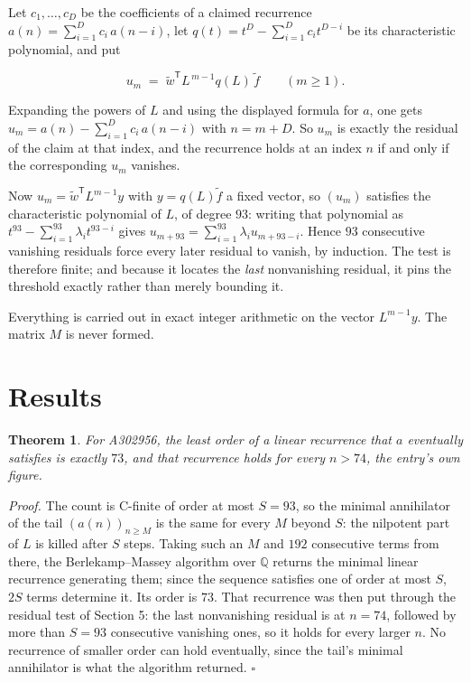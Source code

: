 \documentclass[11pt]{article}
\newtheorem{theorem}{Theorem}
\theoremstyle{definition}
\begin{document}
Let $c_1,\dots,c_D$ be the coefficients of a claimed recurrence $a(n) = \sum_{i=1}^{D} c_i\,a(n-i)$, let $q(t) = t^{D} - \sum_{i=1}^{D} c_i t^{D-i}$ be its characteristic polynomial, and put

\[u_m \;=\; \tilde w^{\mathsf T} L^{\,m-1} q(L)\,\tilde f \qquad (m \ge 1).\]

Expanding the powers of $L$ and using the displayed formula for $a$, one gets $u_m = a(n) - \sum_{i=1}^{D} c_i\,a(n-i)$ with $n = m + D$. So $u_m$ is exactly the residual of the claim at that index, and the recurrence holds at an index $n$ if and only if the corresponding $u_m$ vanishes.

Now $u_m = \tilde w^{\mathsf T} L^{m-1} y$ with $y = q(L)\tilde f$ a fixed vector, so $(u_m)$ satisfies the characteristic polynomial of $L$, of degree $93$: writing that polynomial as $t^{93} - \sum_{i=1}^{93} \lambda_i t^{93-i}$ gives $u_{m+93} = \sum_{i=1}^{93} \lambda_i u_{m+93-i}$. Hence $93$ consecutive vanishing residuals force every later residual to vanish, by induction. The test is therefore finite; and because it locates the {\itshape last} nonvanishing residual, it pins the threshold exactly rather than merely bounding it.

Everything is carried out in exact integer arithmetic on the vector $L^{m-1}y$. The matrix $M$ is never formed.

\section{Results}

\begin{theorem} For A302956, the least order of a linear recurrence that $a$ eventually satisfies is exactly $73$, and that recurrence holds for every $n > 74$, the entry's own figure.\end{theorem}

{\itshape Proof.} The count is C-finite of order at most $S = 93$, so the minimal annihilator of the tail $(a(n))_{n \ge M}$ is the same for every $M$ beyond $S$: the nilpotent part of $L$ is killed after $S$ steps. Taking such an $M$ and $192$ consecutive terms from there, the Berlekamp--Massey algorithm over $\mathbb{Q}$ returns the minimal linear recurrence generating them; since the sequence satisfies one of order at most $S$, $2S$ terms determine it. Its order is $73$. That recurrence was then put through the residual test of Section 5: the last nonvanishing residual is at $n = 74$, followed by more than $S = 93$ consecutive vanishing ones, so it holds for every larger $n$. No recurrence of smaller order can hold eventually, since the tail's minimal annihilator is what the algorithm returned. $\square$
\end{document}
